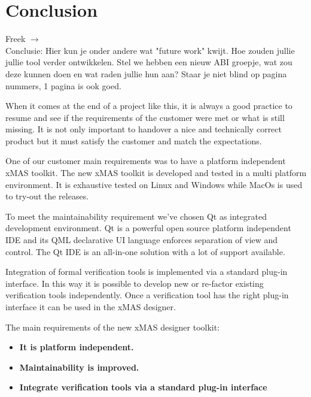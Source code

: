\chapter*{Conclusion}

\begin{tcolorbox}[colback=yellow!30]
Freek $\rightarrow$ \\
 Conclusie: Hier kun je onder andere wat "future work" kwijt. Hoe zouden jullie jullie tool verder ontwikkelen. Stel we hebben een nieuw ABI groepje, wat zou deze kunnen doen en wat raden jullie hun aan? Staar je niet blind op pagina nummers, 1 pagina is ook goed.
\end{tcolorbox}


When it comes at the end of a project like this, it is always a good practice to
resume and see if the requirements of the customer were met or what is still
missing. It is not only important to handover a nice and technically correct
product but it must satisfy the customer and match the expectations.


One of our customer main requirements was to have a platform independent xMAS toolkit.
The new xMAS toolkit is developed and tested in a multi platform environment.
It is exhaustive tested on Linux and Windows while MacOs is used to try-out the releases.

To meet the maintainability requirement we've chosen Qt as integrated development
environment. Qt is a powerful open source platform independent IDE and its QML
declarative UI language enforces separation of view and control. The Qt IDE is
an all-in-one solution with a lot of support available.


Integration of formal verification tools is implemented via a standard plug-in interface.
In this way it is possible to develop new or re-factor existing verification tools independently.
Once a verification tool has the right plug-in interface it can be used in the xMAS designer.


\vspace{0.5 cm}

\begin{tcolorbox}[colback=white]
The main requirements of the new xMAS designer toolkit:
\begin{itemize}
\item \textbf{It is platform independent.}
\item \textbf{Maintainability is improved.}
\item \textbf{Integrate verification tools via a standard plug-in interface}
\end{itemize}
\end{tcolorbox}

